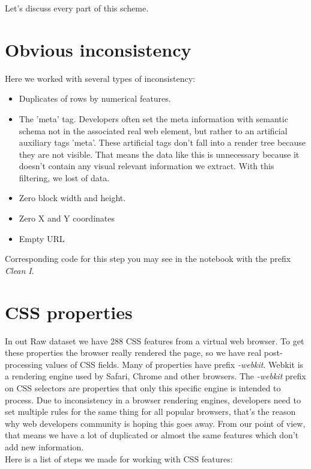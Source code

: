 Let's discuss every part of this scheme.\\

\section*{Obvious inconsistency}

Here we worked with several types of inconsistency:

\begin{itemize}
    \item Duplicates of rows by numerical features.
    \item The 'meta' tag. Developers often set the meta information with semantic schema not in the associated real web element, but rather to an artificial auxiliary tags 'meta'. These artificial tags don't fall into a render tree because they are not visible. That means the data like this is unnecessary because it doesn't contain any visual relevant information we extract. With this filtering, we lost of data.  
    \item Zero block width and height.
    \item Zero X and Y coordinates
    \item Empty URL
\end{itemize}

Corresponding code for this step you may see in the notebook with the prefix \textit{Clean I}.


\section*{CSS properties}
In out Raw dataset we have 288 CSS features from a virtual web browser. To get these properties the browser really rendered the page, so we have real post-processing values of CSS fields. Many of properties have prefix \textit{-webkit}. Webkit is a rendering engine used by Safari, Chrome and other browsers. The \textit{-webkit} prefix on CSS selectors are properties that only this specific engine is intended to process. Due to inconsistency in a browser rendering engines, developers need to set multiple rules for the same thing for all popular browsers, that's the reason why web developers community is hoping this goes away. From our point of view, that means we have a lot of duplicated or almost the same features which don't add new information.\\

Here is a list of steps we made for working with CSS features:

